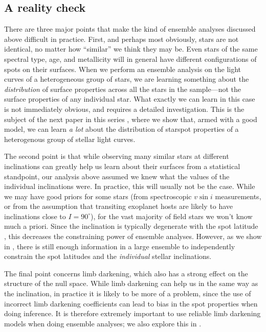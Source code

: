 \documentclass[modern]{aastex62}
\begin{document}
\subsection{A reality check}
\label{sec:reality-check}

There are three major points that make the kind of ensemble
analyses discussed above difficult in practice. First, and perhaps
most obviously, stars are
not identical, no matter how ``similar'' we think they may be.
Even stars of the same spectral type, age, and metallicity will
in general have different configurations of spots on their surfaces.
When we perform an ensemble analysis on the light curves of a
heterogeneous group of stars, we are learning something about the
\emph{distribution} of surface properties across all the stars in
the sample---not the surface properties of any individual star.
What exactly we can learn in this case is not immediately obvious,
and requires a detailed investigation. This is the subject of
the next paper in this series , where we show that,
armed with a good model,
we can learn \emph{a lot} about the distribution of starspot
properties of a heterogenous group of stellar light curves.

The second point is that while observing many similar stars at different
inclinations can greatly help us learn about their surfaces from a
statistical standpoint, our analysis
above assumed we knew what the values of the individual inclinations were.
In practice, this will usually not be the case. While we may have
good priors for some stars (from spectroscopic $v\sin i$ measurements,
or from the assumption that transiting exoplanet hosts are likely
to have inclinations close to $I=90^\circ$), for the vast majority
of field stars we won't know much a priori. Since the inclination
is typically degenerate with the spot latitude \citep[e.g.,][]{Walkowicz2013},
this decreases the constraining power of ensemble analyses.
However, as we show in , there is still enough
information in a large ensemble to independently constrain the spot latitudes
and the \emph{individual} stellar inclinations.

The final point concerns limb darkening, which also has a strong
effect on the structure of the null space. While limb darkening can
help us in the same way as the inclination, in practice it is likely to be more
of a problem, since the use of incorrect limb darkening coefficients can lead
to bias in the spot properties when doing inference.
It is therefore extremely important to use reliable limb darkening models
when doing ensemble analyses; we also explore this in .
\end{document}
